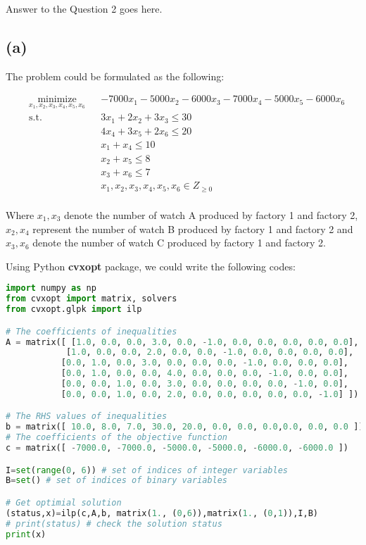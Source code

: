 \documentclass[12pt,letterpaper]{article}
\begin{document}
Answer to the Question 2 goes here.

\subsection*{(a)}

The problem could be formulated as the following:

\begin{equation}
\begin{aligned}
& \underset{x_1, x_2, x_3, x_4, x_5, x_6}{\text{minimize}}
& & -7000x_1 - 5000x_2 - 6000x_3 - 7000x_4 - 5000x_5 - 6000x_6 \\
& \text{s.t.} & &  3x_1+2x_2+3x_3 \leq 30 \\
& & & 4x_4+3x_5+2x_6 \leq 20 \\
& & &  x_1 + x_4 \leq 10 \\
& & &  x_2 + x_5 \leq 8 \\
& & &  x_3 + x_6 \leq 7 \\
& & &  x_1, x_2, x_3, x_4, x_5, x_6 \in Z_{\geq 0} \\
\end{aligned}
\label{optimization2_1}
\end{equation}

Where $x_1, x_3$ denote the number of watch A produced by factory 1 and factory 2, $x_2, x_4$ represent the number of watch B produced by factory 1 and factory 2 and $x_3, x_6$ denote the number of watch C produced by factory 1 and factory 2.

Using Python \textbf{cvxopt} package, we could write the following codes:

\begin{lstlisting}[language=Python, caption=Question 2.a]
import numpy as np
from cvxopt import matrix, solvers
from cvxopt.glpk import ilp

# The coefficients of inequalities
A = matrix([ [1.0, 0.0, 0.0, 3.0, 0.0, -1.0, 0.0, 0.0, 0.0, 0.0, 0.0], 
            [1.0, 0.0, 0.0, 2.0, 0.0, 0.0, -1.0, 0.0, 0.0, 0.0, 0.0], 
           [0.0, 1.0, 0.0, 3.0, 0.0, 0.0, 0.0, -1.0, 0.0, 0.0, 0.0], 
           [0.0, 1.0, 0.0, 0.0, 4.0, 0.0, 0.0, 0.0, -1.0, 0.0, 0.0],
           [0.0, 0.0, 1.0, 0.0, 3.0, 0.0, 0.0, 0.0, 0.0, -1.0, 0.0], 
           [0.0, 0.0, 1.0, 0.0, 2.0, 0.0, 0.0, 0.0, 0.0, 0.0, -1.0] ])

# The RHS values of inequalities
b = matrix([ 10.0, 8.0, 7.0, 30.0, 20.0, 0.0, 0.0, 0.0,0.0, 0.0, 0.0 ])
# The coefficients of the objective function
c = matrix([ -7000.0, -7000.0, -5000.0, -5000.0, -6000.0, -6000.0 ])

I=set(range(0, 6)) # set of indices of integer variables
B=set() # set of indices of binary variables

# Get optimial solution
(status,x)=ilp(c,A,b, matrix(1., (0,6)),matrix(1., (0,1)),I,B)
# print(status) # check the solution status
print(x)
\end{lstlisting}
\end{document}
